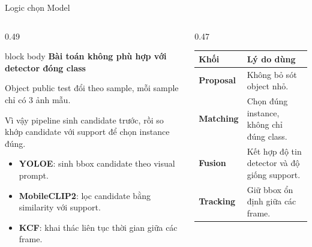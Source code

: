 \documentclass[aspectratio=169]{beamer}
\newcommand{\keyterm}[1]{\textbf{\color{MidBlue}#1}}
\newcommand{\tightitem}{\setlength\itemsep{0.42em}}
\newenvironment{bluebox}[1]{
  \begin{beamercolorbox}[rounded=true,shadow=false,wd=\linewidth,sep=0.28cm]{block body}
  {\bfseries\color{DeepBlue}#1}\par\vspace{0.12cm}
}{
  \end{beamercolorbox}
}
\begin{document}
\begin{frame}{Logic chọn Model}
  \footnotesize
  \begin{columns}[T,onlytextwidth]
    \begin{column}{0.49\textwidth}
      \begin{bluebox}{Bài toán không phù hợp với detector đóng class}
        \scriptsize
        Object public test đổi theo sample, mỗi sample chỉ có 3 ảnh mẫu.\par
        Vì vậy pipeline sinh candidate trước, rồi so khớp candidate với support để chọn instance đúng.
      \end{bluebox}
      \vspace{0.16cm}
      \begin{itemize}
        \tightitem
        \item \keyterm{YOLOE}: sinh bbox candidate theo visual prompt.
        \item \keyterm{MobileCLIP2}: lọc candidate bằng similarity với support.
        \item \keyterm{KCF}: khai thác liên tục thời gian giữa các frame.
      \end{itemize}
    \end{column}
    \begin{column}{0.47\textwidth}
      \begin{tabularx}{\linewidth}{>{\bfseries}lX}
        \toprule
        Khối & Lý do dùng \\
        \midrule
        Proposal & Không bỏ sót object nhỏ. \\
        Matching & Chọn đúng instance, không chỉ đúng class. \\
        Fusion & Kết hợp độ tin detector và độ giống support. \\
        Tracking & Giữ bbox ổn định giữa các frame. \\
        \bottomrule
      \end{tabularx}
    \end{column}
  \end{columns}
\end{frame}
\end{document}
